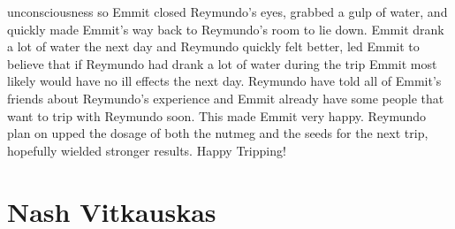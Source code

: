 \documentclass[12pt]{book}
\begin{document}
unconsciousness so Emmit closed Reymundo's eyes, grabbed a gulp of water, and quickly made Emmit's way back to Reymundo's room to lie down. Emmit drank a lot of water the next day and Reymundo quickly felt better, led Emmit to believe that if Reymundo had drank a lot of water during the trip Emmit most likely would have no ill effects the next day. Reymundo have told all of Emmit's friends about Reymundo's experience and Emmit already have some people that want to trip with Reymundo soon. This made Emmit very happy. Reymundo plan on upped the dosage of both the nutmeg and the seeds for the next trip, hopefully wielded stronger results. Happy Tripping!



\chapter{Nash Vitkauskas}
\end{document}

